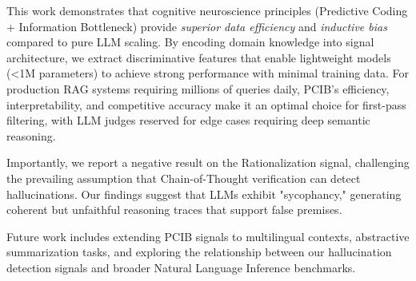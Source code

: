 \documentclass[11pt,letterpaper]{article}
\begin{document}
This work demonstrates that cognitive neuroscience principles (Predictive Coding + Information Bottleneck) provide \textit{superior data efficiency} and \textit{inductive bias} compared to pure LLM scaling. By encoding domain knowledge into signal architecture, we extract discriminative features that enable lightweight models (<1M parameters) to achieve strong performance with minimal training data. For production RAG systems requiring millions of queries daily, PCIB's efficiency, interpretability, and competitive accuracy make it an optimal choice for first-pass filtering, with LLM judges reserved for edge cases requiring deep semantic reasoning.

Importantly, we report a negative result on the Rationalization signal, challenging the prevailing assumption that Chain-of-Thought verification can detect hallucinations. Our findings suggest that LLMs exhibit "sycophancy," generating coherent but unfaithful reasoning traces that support false premises.

Future work includes extending PCIB signals to multilingual contexts, abstractive summarization tasks, and exploring the relationship between our hallucination detection signals and broader Natural Language Inference benchmarks.



\end{document}
